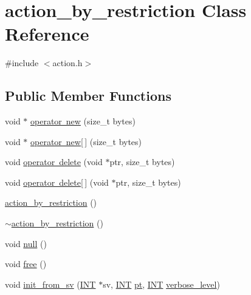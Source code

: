 \hypertarget{classaction__by__restriction}{}\section{action\+\_\+by\+\_\+restriction Class Reference}
\label{classaction__by__restriction}


{\ttfamily \#include $<$action.\+h$>$}

\subsection*{Public Member Functions}
\begin{DoxyCompactItemize}
\item 
void $\ast$ \mbox{\hyperlink{classaction__by__restriction_a97ee85992957dd1a9ffef060fddeb9c6}{operator new}} (size\+\_\+t bytes)
\item 
void $\ast$ \mbox{\hyperlink{classaction__by__restriction_a7679ed0ab76b9955edd7e8bc5034dab0}{operator new\mbox{[}$\,$\mbox{]}}} (size\+\_\+t bytes)
\item 
void \mbox{\hyperlink{classaction__by__restriction_a7dad8dad16d7a750c86216b563bc72a0}{operator delete}} (void $\ast$ptr, size\+\_\+t bytes)
\item 
void \mbox{\hyperlink{classaction__by__restriction_a5569d79b7d30fb253d26feaca50b6548}{operator delete\mbox{[}$\,$\mbox{]}}} (void $\ast$ptr, size\+\_\+t bytes)
\item 
\mbox{\hyperlink{classaction__by__restriction_a0f00372746ec06fde4350c2e4e20c8c1}{action\+\_\+by\+\_\+restriction}} ()
\item 
\mbox{\hyperlink{classaction__by__restriction_a41b6e37425a151b509bffa1f36a96939}{$\sim$action\+\_\+by\+\_\+restriction}} ()
\item 
void \mbox{\hyperlink{classaction__by__restriction_adf791e945d5b8db41dd6ab9be10f6471}{null}} ()
\item 
void \mbox{\hyperlink{classaction__by__restriction_a0635c562fbf754d8230ed1d8e5e32719}{free}} ()
\item 
void \mbox{\hyperlink{classaction__by__restriction_a08b2a71881e69fb63dd7d66ba0f6ea50}{init\+\_\+from\+\_\+sv}} (\mbox{\hyperlink{galois_8h_a09fddde158a3a20bd2dcadb609de11dc}{I\+NT}} $\ast$sv, \mbox{\hyperlink{galois_8h_a09fddde158a3a20bd2dcadb609de11dc}{I\+NT}} \mbox{\hyperlink{clique__finder_8_c_aec1f1a2b30fdca8844c2932384483145}{pt}}, \mbox{\hyperlink{galois_8h_a09fddde158a3a20bd2dcadb609de11dc}{I\+NT}} \mbox{\hyperlink{simeon_8_c_a818073fbcc2f439e7c56952f67386122}{verbose\+\_\+level}})

\end{DoxyCompactItemize}
